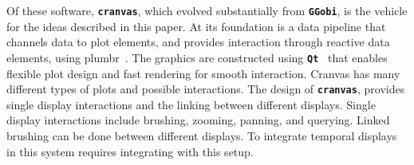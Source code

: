 \documentclass[12pt]{article}
\newcommand{\red}[1]{{\color{red} #1}}
\begin{document}
Of these software, \texttt{\textbf{cranvas}}, which evolved substantially from  \texttt{\textbf{GGobi}}, is the vehicle for the ideas described in this paper.
At its foundation is a data pipeline that channels data to plot elements, and provides interaction through reactive data elements, using plumbr~\citep{plumbr2014}. The
graphics are constructed using \texttt{\textbf{Qt}}~\citep{Qt} that enables flexible plot design and fast rendering for smooth interaction. Cranvas has
many different types of plots and possible interactions.
The design of \texttt{\textbf{cranvas}}, \citet{xie2014reactive} provides single display interactions and the linking between different displays. Single display interactions include brushing, zooming, panning, and querying. Linked brushing can be done between different displays. To integrate temporal displays in this system requires integrating with this setup. %


\end{document}
